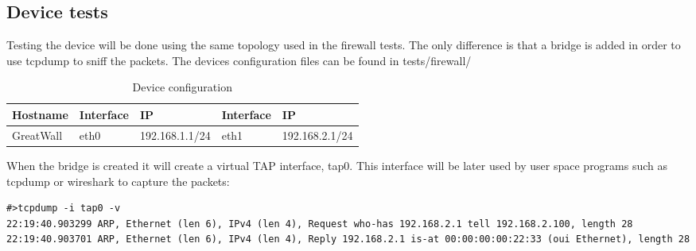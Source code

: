 \subsection{Device tests}
\label{sub-sec:bridge-tests}

Testing the device will be done using the same topology used in the firewall tests. The only difference
is that a bridge is added in order to use tcpdump to sniff the packets. The devices configuration files
can be found in tests/firewall/


\begin{center}
  \begin{table}[htb]
  \begin{center}
  \begin{tabular}{| l | l | l | l | l |}
    \hline
      \textbf{Hostname} & \textbf{Interface} & \textbf{IP} & \textbf{Interface} & \textbf{IP} \\ \hline
      GreatWall & eth0 & 192.168.1.1/24 & eth1 & 192.168.2.1/24 \\ 
    \hline
  \end{tabular}
  \end{center}
  \caption{Device configuration}
  \label{table:tdevices}
  \end{table}
\end{center}

When the bridge is created it will create a virtual TAP interface,  tap0. This interface will be later used
by user space programs such as tcpdump or wireshark to capture the packets:

\lstset{language=text, caption=Arp request and response}
\begin{lstlisting}
#>tcpdump -i tap0 -v
22:19:40.903299 ARP, Ethernet (len 6), IPv4 (len 4), Request who-has 192.168.2.1 tell 192.168.2.100, length 28
22:19:40.903701 ARP, Ethernet (len 6), IPv4 (len 4), Reply 192.168.2.1 is-at 00:00:00:00:22:33 (oui Ethernet), length 28
\end{lstlisting}

